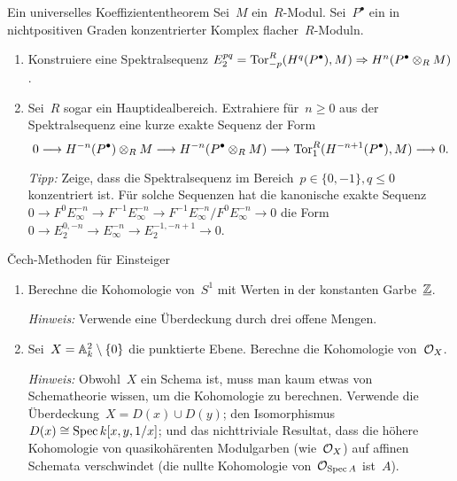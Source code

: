 \documentclass{uebblatt}
\begin{document}

\begin{aufgabe}{Ein universelles Koeffiziententheorem}
Sei~$M$ ein~$R$-Modul. Sei~$P^\bullet$ ein in nichtpositiven Graden
konzentrierter Komplex flacher~$R$-Moduln.
\begin{enumerate}
\item Konstruiere eine Spektralsequenz $E_2^{pq} =
\Tor_{-p}^R(H^q(P^\bullet),M) \Rightarrow H^n(P^\bullet \otimes_R M)$.
\item Sei~$R$ sogar ein Hauptidealbereich. Extrahiere für~$n \geq 0$ aus der
Spektralsequenz eine kurze exakte Sequenz der Form
\[ 0 \lra H^{-n}(P^\bullet) \otimes_R M \lra H^{-n}(P^\bullet \otimes_R M)
  \lra \Tor_1^R(H^{-n+1}(P^\bullet), M) \lra 0. \]
{\tiny\emph{Tipp:} Zeige, dass die Spektralsequenz im Bereich~$p \in \{ 0,-1
\}, q \leq 0$ konzentriert ist. Für solche Sequenzen hat die
kanonische exakte Sequenz $0 \to F^0 E_\infty^{-n} \to F^{-1}
E_\infty^{-n} \to F^{-1} E_\infty^{-n} / F^0 E_\infty^{-n} \to 0$ die Form
$0 \to E_2^{0,-n} \to E_\infty^{-n} \to E_2^{-1,-n+1} \to 0$.\par}
\end{enumerate}
\end{aufgabe}

\begin{aufgabe}{Čech-Methoden für Einsteiger}
\begin{enumerate}
\item Berechne die Kohomologie von~$S^1$ mit Werten in der konstanten Garbe~$\ul{\ZZ}$.

{\tiny\emph{Hinweis:} Verwende eine Überdeckung durch drei offene Mengen.\par}

\item Sei~$X = \AA^2_k \setminus \{0\}$ die punktierte Ebene.
Berechne die Kohomologie von~$\O_X$.

{\tiny\emph{Hinweis:} Obwohl~$X$ ein Schema ist, muss man kaum etwas von
Schematheorie wissen, um die Kohomologie zu berechnen. Verwende die
Überdeckung~$X = D(x) \cup D(y)$; den Isomorphismus~$D(x) \cong \Spec
k[x,y,1/x]$; und das nichttriviale Resultat, dass die höhere Kohomologie von
quasikohärenten Modulgarben (wie~$\O_X$) auf affinen Schemata
verschwindet (die nullte Kohomologie von~$\O_{\Spec A}$ ist~$A$).\par}
\end{enumerate}
\end{aufgabe}
\end{document}

